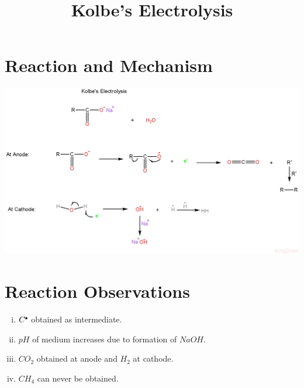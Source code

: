\documentclass{article}
\title{Kolbe's Electrolysis}
\author{}
\date{}
\newcommand*\fullcirc[1][0.3ex]{\tikz\fill (0,0) circle (#1);}
\begin{document}
\maketitle

\section{Reaction and Mechanism}
\begin{center}
    \includegraphics[scale=0.25]{Kolbe'sElectrolysis_1722168095985.JPEG}
\end{center}
\section{Reaction Observations}
\begin{enumerate}[i.]
    \item $C^{\fullcirc}$ obtained as intermediate.
    \item $pH$ of medium increases due to formation of $NaOH$.
    \item $CO_{2}$ obtained at anode and $H_{2}$ at cathode.
    \item $CH_{4}$ can never be obtained.
\end{enumerate}
\end{document}
